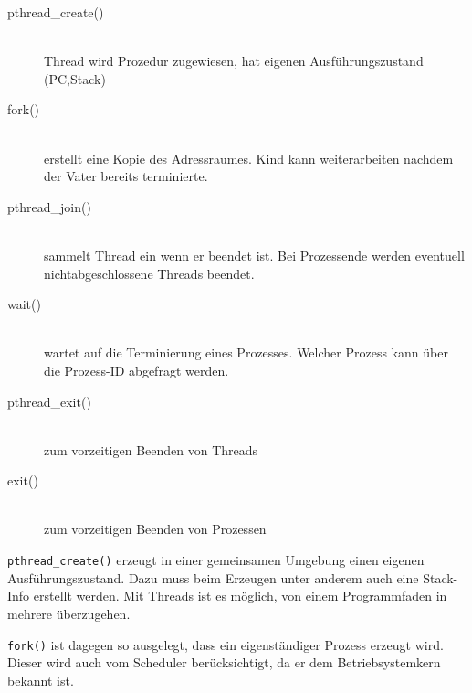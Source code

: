 \begin{answer}
\begin{description}

\item[pthread\_create()] \hfill \\ 
Thread wird Prozedur zugewiesen, hat eigenen Ausführungszustand (PC,Stack)

\item[fork()] \hfill \\ 
erstellt eine Kopie des Adressraumes. Kind kann weiterarbeiten nachdem der Vater bereits terminierte.

\item[pthread\_join()] \hfill \\ 
sammelt Thread ein wenn er beendet ist. Bei Prozessende werden eventuell nichtabgeschlossene
Threads beendet.

\item[wait()] \hfill \\ 
wartet auf die Terminierung eines Prozesses. Welcher Prozess kann über die Prozess-ID abgefragt
werden.

\item[pthread\_exit()] \hfill \\ 
zum vorzeitigen Beenden von Threads

\item[exit()] \hfill \\ 
zum vorzeitigen Beenden von Prozessen
\end{description}

\texttt{pthread\_create()} erzeugt in einer gemeinsamen Umgebung einen eigenen Ausführungszustand. Dazu muss
beim Erzeugen unter anderem auch eine Stack-Info erstellt werden. Mit Threads ist es möglich,
von einem Programmfaden in mehrere überzugehen. 

\texttt{fork()} ist dagegen so ausgelegt, dass ein
eigenständiger Prozess erzeugt wird. Dieser wird auch vom Scheduler berücksichtigt, da er dem
Betriebsystemkern bekannt ist.
\end{answer}

